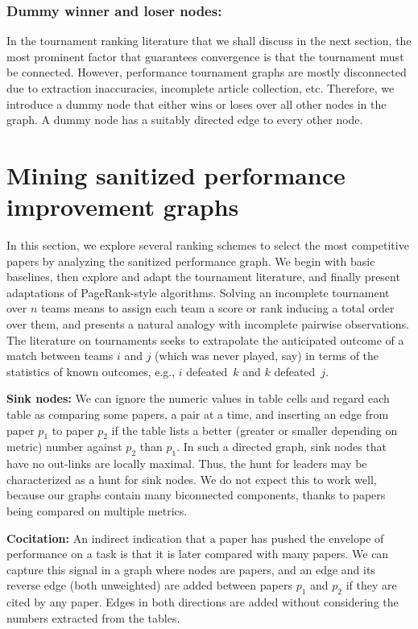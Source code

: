 \documentclass[runningheads]{llncs}
\begin{document}
\subsubsection{Dummy winner and loser nodes:}
In the tournament ranking literature that we shall discuss in the next section, the most prominent factor that guarantees convergence is that the tournament must be connected. However, performance tournament graphs are mostly disconnected due to extraction inaccuracies, incomplete article collection, etc.  Therefore, we introduce a dummy node that either wins or loses over all other nodes in the graph. A dummy node has a suitably directed edge to every other node.


\section{Mining sanitized performance improvement graphs}
\label{minegraph}

In this section, we explore several ranking schemes to select the most competitive papers by analyzing the sanitized performance graph. We begin with basic baselines, then explore and adapt the tournament literature, and finally present adaptations of PageRank-style algorithms. Solving an incomplete tournament over $n$ teams means to assign each team a score or rank inducing a total order over them, and presents a natural analogy with incomplete pairwise observations.  The literature on tournaments seeks to extrapolate the anticipated outcome of a match between teams $i$ and $j$ (which was never played, say) in terms of the statistics of known outcomes, e.g., $i$ defeated~$k$ and $k$ defeated~$j$.

\noindent \textbf{Sink nodes:}
We can ignore the numeric values in table cells and regard each table as comparing some papers, a pair at a time, and inserting an edge from paper $p_1$ to paper $p_2$ if the table lists a better (greater or smaller depending on metric) number against $p_2$ than $p_1$.  In such a directed graph, sink nodes that have no out-links are locally maximal.  Thus, the hunt for leaders may be characterized as a hunt for sink nodes.  We do not expect this to work well, because our graphs contain many biconnected components, thanks to papers being compared on multiple metrics.

\noindent \textbf{Cocitation:}
An indirect indication that a paper has pushed the envelope of performance on a task is that it is later compared with many papers.  We can capture this signal in a graph where nodes are papers, and an edge and its reverse edge (both unweighted) are added between papers $p_1$ and $p_2$ if they are cited by any paper.  Edges in both directions are added without considering the numbers extracted from the tables.
\end{document}
